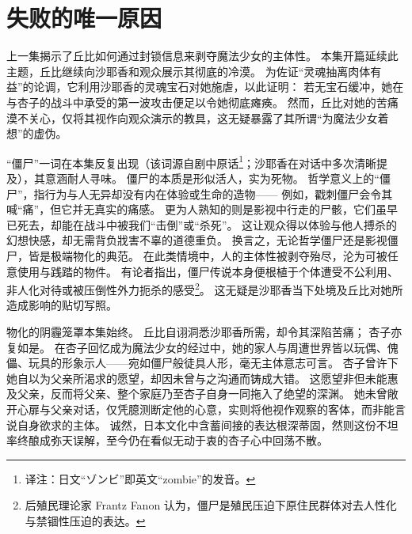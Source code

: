 \chapter[失败的唯一原因]{失败的唯一原因}


上一集揭示了丘比如何通过封锁信息来剥夺魔法少女的主体性。
本集开篇延续此主题，丘比继续向沙耶香和观众展示其彻底的冷漠。
为佐证“灵魂抽离肉体有益”的论调，它利用沙耶香的灵魂宝石对她施虐，以此证明：
若无宝石缓冲，她在与杏子的战斗中承受的第一波攻击便足以令她彻底瘫痪。
然而，丘比对她的苦痛漠不关心，仅将其视作向观众演示的教具，这无疑暴露了其所谓“为魔法少女着想”的虚伪。

“僵尸”一词在本集反复出现（该词源自剧中原话\footnote{%
    译注：日文“ゾンビ”即英文“zombie”的发音。
}；沙耶香在对话中多次清晰提及），其意涵耐人寻味。
僵尸的本质是形似活人，实为死物。
哲学意义上的“僵尸”，指行为与人无异却没有内在体验或生命的造物——
例如，戳刺僵尸会令其喊“痛”，但它并无真实的痛感\cite{ref39}。
更为人熟知的则是影视中行走的尸骸，它们虽早已死去，却能在战斗中被我们“击倒”或“杀死”。
这让观众得以体验与他人搏杀的幻想快感，却无需背负戕害不辜的道德重负\cite{ref40}。
换言之，无论哲学僵尸还是影视僵尸，皆是极端物化的典范。
在此类情境中，人的主体性被剥夺殆尽，沦为可被任意使用与践踏的物件。
有论者指出，僵尸传说本身便根植于个体遭受不公利用、非人化对待或被压倒性外力扼杀的感受\footnote{%
    后殖民理论家 Frantz Fanon 认为，僵尸是殖民压迫下原住民群体对去人性化与禁锢性压迫的表达。
}\cite{ref41}。
这无疑是沙耶香当下处境及丘比对她所造成影响的贴切写照。

物化的阴霾笼罩本集始终。
丘比自诩洞悉沙耶香所需，却令其深陷苦痛；
杏子亦复如是。
在杏子回忆成为魔法少女的经过中，她的家人与周遭世界皆以玩偶、傀儡、玩具的形象示人——宛如僵尸般徒具人形，毫无主体意志可言。
杏子曾许下她自以为父亲所渴求的愿望，却因未曾与之沟通而铸成大错。
这愿望非但未能惠及父亲，反而将父亲、整个家庭乃至杏子自身一同拖入了绝望的深渊。
她未曾敞开心扉与父亲对话，仅凭臆测断定他的心意，实则将他视作观察的客体，而非能言说自身欲求的主体。
诚然，日本文化中含蓄间接的表达根深蒂固\cite{ref42}，然则这份不坦率终酿成弥天误解，至今仍在看似无动于衷的杏子心中回荡不散。

